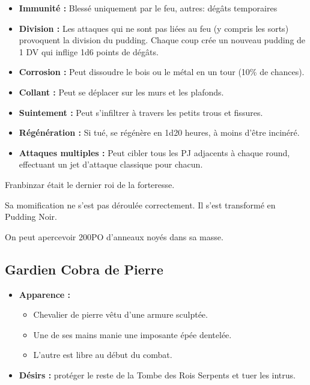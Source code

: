 \begin{itemize}
  \item \textbf{Immunité :} Blessé uniquement par le feu, autres: dégâts temporaires
  \item \textbf{Division :} Les attaques qui ne sont pas liées au feu (y compris les sorts) provoquent la division du pudding. Chaque coup crée un nouveau pudding de 1 DV qui inflige 1d6 points de dégâts.
  \item \textbf{Corrosion :} Peut dissoudre le bois ou le métal en un tour (10\% de chances).
  \item \textbf{Collant :} Peut se déplacer sur les murs et les plafonds.
  \item \textbf{Suintement :} Peut s'infiltrer à travers les petits trous et fissures.
  \item \textbf{Régénération :} Si tué, se régénère en 1d20 heures, à moins d'être incinéré.
  \item \textbf{Attaques multiples :} Peut cibler tous les PJ adjacents à chaque round, effectuant un jet d'attaque classique pour chacun.
\end{itemize}

Franbinzar était le dernier roi de la forteresse.

Sa momification ne s'est pas déroulée correctement.
Il s'est transformé en Pudding Noir.

On peut apercevoir 200PO d'anneaux noyés dans sa masse.

\vfill


\subsection{Gardien Cobra de Pierre}\label{monster:s19}
\begin{itemize}
  \item \textbf{Apparence :}
  \begin{itemize}
    \item  Chevalier de pierre vêtu d'une armure sculptée.
    \item Une de ses mains manie une imposante épée dentelée.
    \item L'autre est libre au début du combat.
  \end{itemize}
  \item \textbf{ Désirs :}  protéger le reste de la Tombe des Rois Serpents et  tuer les intrus.
\end{itemize}

